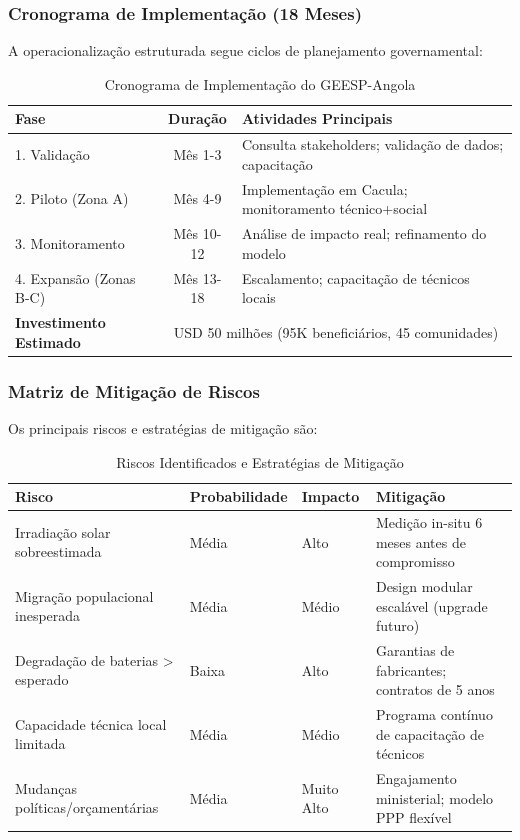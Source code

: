 \documentclass[12pt, a4paper]{article}
\begin{document}
\subsubsection{Cronograma de Implementação (18 Meses)}

A operacionalização estruturada segue ciclos de planejamento governamental:

\begin{table}[H]
\centering
\caption{Cronograma de Implementação do GEESP-Angola}
\label{tab:timeline}
\small
\begin{tabular}{|l|c|l|}
\hline
\textbf{Fase} & \textbf{Duração} & \textbf{Atividades Principais} \\
\hline
1. Validação & Mês 1-3 & Consulta stakeholders; validação de dados; capacitação \\
2. Piloto (Zona A) & Mês 4-9 & Implementação em Cacula; monitoramento técnico+social \\
3. Monitoramento & Mês 10-12 & Análise de impacto real; refinamento do modelo \\
4. Expansão (Zonas B-C) & Mês 13-18 & Escalamento; capacitação de técnicos locais \\
\hline
\textbf{Investimento Estimado} & \multicolumn{2}{c|}{USD 50 milhões (95K beneficiários, 45 comunidades)} \\
\hline
\end{tabular}
\end{table}

\subsubsection{Matriz de Mitigação de Riscos}

Os principais riscos e estratégias de mitigação são:

\begin{table}[H]
\centering
\caption{Riscos Identificados e Estratégias de Mitigação}
\label{tab:risks}
\footnotesize
\begin{tabular}{|l|l|l|l|}
\hline
\textbf{Risco} & \textbf{Probabilidade} & \textbf{Impacto} & \textbf{Mitigação} \\
\hline
Irradiação solar sobreestimada & Média & Alto & Medição in-situ 6 meses antes de compromisso \\
Migração populacional inesperada & Média & Médio & Design modular escalável (upgrade futuro) \\
Degradação de baterias > esperado & Baixa & Alto & Garantias de fabricantes; contratos de 5 anos \\
Capacidade técnica local limitada & Média & Médio & Programa contínuo de capacitação de técnicos \\
Mudanças políticas/orçamentárias & Média & Muito Alto & Engajamento ministerial; modelo PPP flexível \\
\hline
\end{tabular}
\end{table}
\end{document}
